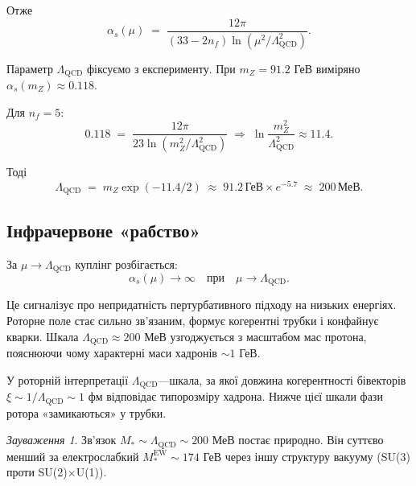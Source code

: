 \documentclass[11pt,a4paper]{article}
\theoremstyle{definition}
\theoremstyle{plain}
\theoremstyle{remark}
\newtheorem{remark}{Зауваження}[section]
\begin{document}
Отже
\begin{equation}
\alpha_s(\mu) \;=\; \frac{12\pi}{(33 - 2n_f)\ln(\mu^2/\Lambda_{\mathrm{QCD}}^2)}.
\label{eq:running-coupling}
\end{equation}

Параметр $\Lambda_{\mathrm{QCD}}$ фіксуємо з експерименту. При $m_Z=91{.}2$ ГеВ виміряно $\alpha_s(m_Z)\approx 0{.}118$.

Для $n_f=5$:
\begin{equation}
0{.}118 \;=\; \frac{12\pi}{23\ln(m_Z^2/\Lambda_{\mathrm{QCD}}^2)} \;\Rightarrow\; \ln\frac{m_Z^2}{\Lambda_{\mathrm{QCD}}^2} \approx 11{.}4.
\end{equation}

Тоді
\begin{equation}
\Lambda_{\mathrm{QCD}} \;=\; m_Z \exp(-11{.}4/2) \;\approx\; 91{.}2\,\text{ГеВ}\times e^{-5{.}7} \;\approx\; \boxed{200\,\text{МеВ}.}
\label{eq:lambda-qcd}
\end{equation}

\subsection{Інфрачервоне «рабство»}

За $\mu\to\Lambda_{\mathrm{QCD}}$ куплінг розбігається:
\begin{equation}
\alpha_s(\mu)\to\infty \quad \text{при}\quad \mu\to\Lambda_{\mathrm{QCD}}.
\end{equation}

Це сигналізує про непридатність пертурбативного підходу на низьких енергіях. Роторне поле стає сильно зв’язаним, формує когерентні трубки і конфайнує кварки. Шкала $\Lambda_{\mathrm{QCD}}\approx 200$ МеВ узгоджується з масштабом мас протона, пояснюючи чому характерні маси хадронів $\sim 1$ ГеВ.

У роторній інтерпретації $\Lambda_{\mathrm{QCD}}$—шкала, за якої довжина когерентності бівекторів $\xi\sim 1/\Lambda_{\mathrm{QCD}}\sim 1$ фм відповідає типорозміру хадрона. Нижче цієї шкали фази ротора «замикаються» у трубки.

\begin{remark}
Зв’язок $M_\ast\sim\Lambda_{\mathrm{QCD}}\sim 200$ МеВ постає природно. Він суттєво менший за електрослабкий $M_\ast^{\mathrm{EW}}\sim 174$ ГеВ через іншу структуру вакууму (SU(3) проти SU(2)$\times$U(1)).
\end{remark}

\vspace{1em}
\end{document}

